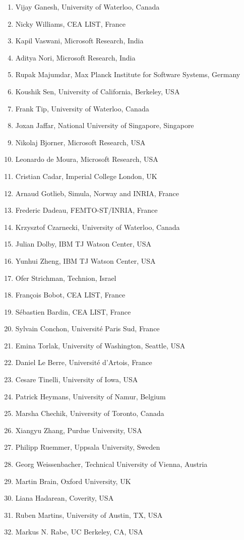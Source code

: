 \documentclass{sig-alternate}
\begin{document}
\begin{enumerate}
\item Vijay Ganesh, University of Waterloo, Canada
\item Nicky Williams, CEA LIST, France
\item Kapil Vaswani, Microsoft Research, India
\item Aditya Nori, Microsoft Research, India
\item Rupak Majumdar, Max Planck Institute for Software Systems, Germany
\item Koushik Sen, University of California, Berkeley, USA
\item Frank Tip, University of Waterloo, Canada
\item Joxan Jaffar, National University of Singapore, Singapore
\item Nikolaj Bjorner, Microsoft Research, USA
\item Leonardo de Moura, Microsoft Research, USA
\item Cristian Cadar, Imperial College London, UK
\item Arnaud Gotlieb, Simula, Norway and INRIA, France
\item Frederic Dadeau, FEMTO-ST/INRIA, France
\item Krzysztof Czarnecki, University of Waterloo, Canada
\item Julian Dolby, IBM TJ Watson Center, USA
\item Yunhui Zheng, IBM TJ Watson Center, USA
\item Ofer Strichman, Technion, Israel
\item Fran{\c c}ois Bobot, CEA LIST, France
\item S{\'e}bastien Bardin, CEA LIST, France
\item Sylvain Conchon, Universit{\'e} Paris Sud, France
\item Emina Torlak, University of Washington, Seattle, USA
\item Daniel Le Berre, Universit{\'e} d'Artois, France
\item Cesare Tinelli, University of Iowa, USA
\item Patrick Heymans, University of Namur, Belgium
\item Marsha Chechik, University of Toronto, Canada
\item Xiangyu Zhang, Purdue University, USA
\item Philipp Ruemmer, Uppsala University, Sweden
\item Georg Weissenbacher, Technical University of Vienna, Austria
\item Martin Brain, Oxford University, UK
\item Liana Hadarean, Coverity, USA
\item Ruben Martins, University of Austin, TX, USA
\item Markus N. Rabe, UC Berkeley, CA, USA
\end{enumerate}
\end{document}
